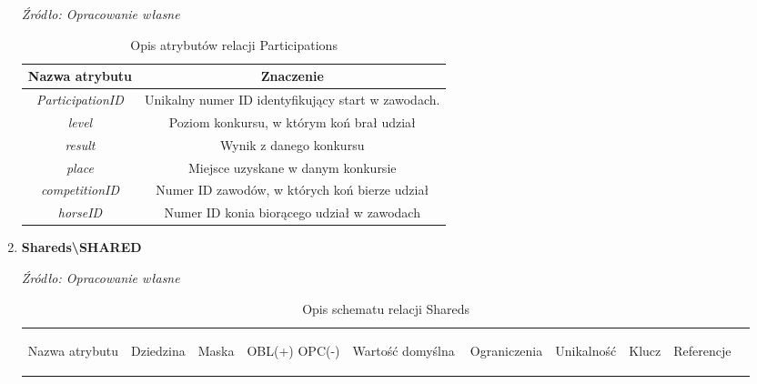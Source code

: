 \documentclass[12pt,twoside]{report}
\begin{document}
\begin{enumerate}[start=10,label={\bfseries REL\textbackslash\arabic*}]
	\begin{table}[H]
		\caption{Opis atrybutów relacji Participations}
		\textit{Źródło: Opracowanie własne}
		\label{ParticipationsAttributeDescription}
		\centering
		\begin{tabular}{|c|c|}
			\hline
			Nazwa atrybutu & Znaczenie \\
			\hline			
			\textit{ParticipationID}&Unikalny numer ID identyfikujący start w zawodach.\\	
			\hline			
			\textit{level}&Poziom konkursu, w którym koń brał udział\\	
			\hline			
			\textit{result}&Wynik z danego konkursu\\	
			\hline			
			\textit{place}&Miejsce uzyskane w danym konkursie\\	
			\hline			
			\textit{competitionID}& Numer ID zawodów, w których koń bierze udział\\	
			\hline
			\textit{horseID}&Numer ID konia biorącego udział w zawodach\\	
			\hline
		\end{tabular}
	\end{table}
	\item \textbf{Shareds\textbackslash SHARED} 
	\begin{table}[H]
		\caption{Opis schematu relacji Shareds}
		\textit{Źródło: Opracowanie własne}
		\label{SharedsRelationSchema}
		\centering
		\begin{tabular}{|c|c|c|c|c|c|c|c|c|c|}
			\hline
			\begin{sideways}Nazwa atrybutu\end{sideways}& 
			\begin{sideways}Dziedzina \end{sideways}& 
			\begin{sideways}Maska \end{sideways}& 
			\begin{sideways}OBL(+) OPC(-)\end{sideways} & 
			\begin{sideways}Wartość domyślna$\ $\end{sideways}& 
			\begin{sideways}Ograniczenia\end{sideways} &
			\begin{sideways}Unikalność \end{sideways}& 
			\begin{sideways}Klucz \end{sideways}& 
			\begin{sideways}Referencje \end{sideways}&

\end{tabular}
\end{table}
\end{enumerate}
\end{document}
